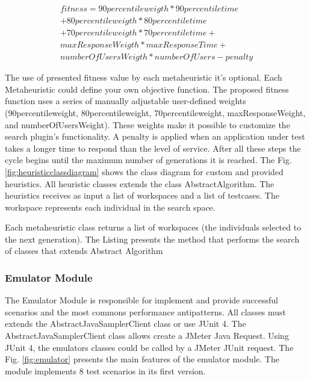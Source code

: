 \begin{equation}
\begin{aligned}
fitness=90percentileweigth* 90percentiletime\\
+80percentileweigth*80percentiletime\\+
70percentileweigth*70percentiletime+\\
maxResponseWeigth*maxResponseTime+\\
numberOfUsersWeigth*numberOfUsers-penalty
\end{aligned}
\end{equation}

The use of presented fitness value by each metaheuristic it's optional. Each Metaheuristic could define your own objective function. The proposed  fitness function uses a series of manually adjustable user-defined weights (90percentileweight, 80percentileweight,  70percentileweight, maxResponseWeight, and numberOfUsersWeight). These weights make it possible to customize the search plugin's functionality. A penalty is applied when an application under test takes a longer time to respond than the level of service. After all these steps the cycle begins until the maximum number of generations it is reached. The Fig. \ref{fig:heuristicclassdiagram} shows the  class diagram for custom and provided heuristics. All heuristic classes extends the class AbstractAlgorithm. The heuristics receives  as input a  list of workspaces and a list of testcases. The workspace represents each individual in the search space.


Each metaheuristic class returns a list of workspaces (the individuals selected to the next generation). The Listing presents the method that performs the search of classes that extends Abstract Algorithm



\subsubsection{Emulator Module}

The Emulator Module is responsible for implement and provide successful scenarios and the most commons performance antipatterns. All classes must extends the AbstractJavaSamplerClient class or use JUnit 4. The AbstractJavaSamplerClient class allows create a JMeter Java Request.  Using JUnit 4, the emulators classes could be called by a JMeter JUnit request. The Fig. \ref{fig:emulator} presents the main features of the emulator module. The module implements 8 test scenarios in its first version.

